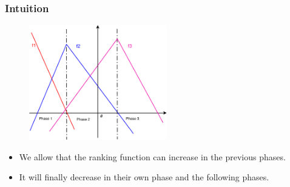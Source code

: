 \begin{frame}
\frametitle{Intuition}
\begin{figure}  %
  \includegraphics[width=6cm,height = 5cm]{pictures/phase}  
\end{figure}
\begin{itemize}
\item We allow that the ranking function can increase in the previous phases.
\item It will finally decrease in their own phase and the following phases. 
\end{itemize}
\end{frame}

